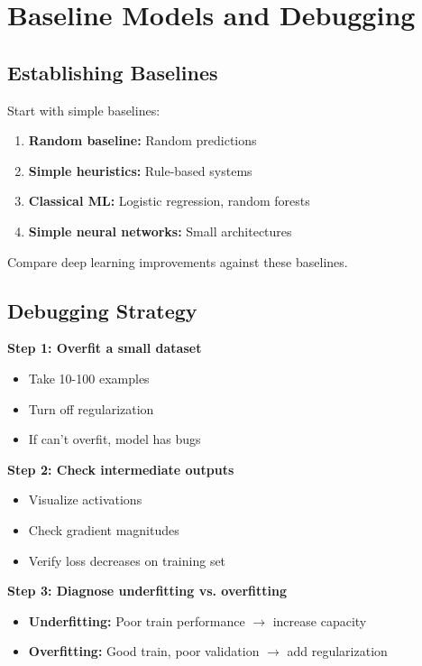 
\section{Baseline Models and Debugging}
\label{sec:baselines-debugging}

\subsection{Establishing Baselines}

Start with simple baselines:
\begin{enumerate}
    \item \textbf{Random baseline:} Random predictions
    \item \textbf{Simple heuristics:} Rule-based systems
    \item \textbf{Classical ML:} Logistic regression, random forests
    \item \textbf{Simple neural networks:} Small architectures
\end{enumerate}

Compare deep learning improvements against these baselines.

\subsection{Debugging Strategy}

\textbf{Step 1: Overfit a small dataset}
\begin{itemize}
    \item Take 10-100 examples
    \item Turn off regularization
    \item If can't overfit, model has bugs
\end{itemize}

\textbf{Step 2: Check intermediate outputs}
\begin{itemize}
    \item Visualize activations
    \item Check gradient magnitudes
    \item Verify loss decreases on training set
\end{itemize}

\textbf{Step 3: Diagnose underfitting vs. overfitting}
\begin{itemize}
    \item \textbf{Underfitting:} Poor train performance $\to$ increase capacity
    \item \textbf{Overfitting:} Good train, poor validation $\to$ add regularization
\end{itemize}

